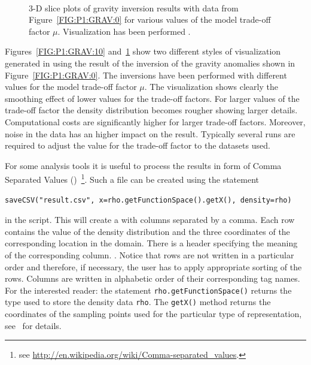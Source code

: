 \begin{figure}
\begin{center}
{        }\\ %
    \end{center}
    \caption{3-D slice plots of gravity inversion results with data from
    Figure~\ref{FIG:P1:GRAV:0} for various values of the model trade-off
    factor $\mu$. Visualization has been performed \VisIt.
    }
    \label{FIG:P1:GRAV:11}
\end{figure}

Figures~\ref{FIG:P1:GRAV:10} and~\ref{FIG:P1:GRAV:11} show two different
styles of visualization generated in \VisIt using the result of the inversion
of the gravity anomalies shown in Figure~\ref{FIG:P1:GRAV:0}.
The inversions have been performed with different values for the model
trade-off factor $\mu$.
The visualization shows clearly the smoothing effect of lower values for the
trade-off factors.
For larger values of the trade-off factor the density distribution becomes
rougher showing larger details.
Computational costs are significantly higher for larger trade-off factors.
Moreover, noise in the data has an higher impact on the result.
Typically several runs are required to adjust the value for the trade-off
factor to the datasets used.

For some analysis tools it is useful to process the results in form of Comma
Separated Values (\CSV)~\footnote{see 
\url{http://en.wikipedia.org/wiki/Comma-separated_values}.}.
Such a file can be created using the statement
\begin{verbatim}
saveCSV("result.csv", x=rho.getFunctionSpace().getX(), density=rho)
\end{verbatim}
in the script.
This will create a  with columns separated by a comma.
Each row contains the value of the density distribution and the three
coordinates of the corresponding location in the domain.
There is a header specifying the meaning of the corresponding column.
.
Notice that rows are not written in a particular order and therefore, if
necessary, the user has to apply appropriate sorting of the rows.
Columns are written in alphabetic order of their corresponding tag names.
For the interested reader: the statement \verb|rho.getFunctionSpace()| returns
the type used to store the density data \verb|rho|.
The \verb|getX()| method returns the coordinates of the sampling points used
for the particular type of representation, see~\cite{ESCRIPT} for details. 


